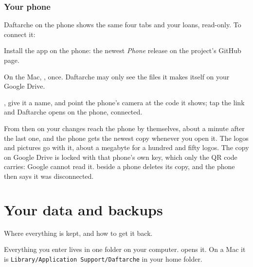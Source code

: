 \documentclass[11pt]{article}
\begin{document}
\subsection{Your phone}
Daftarche on the phone shows the same four tabs and your loans, read-only. To connect it:
\begin{steps}
  \item Install the app on the phone: the newest \emph{Phone} release on the project's GitHub page.
  \item On the Mac, , once. Daftarche may only
        see the files it makes itself on your Google Drive.
  \item {}, give it a name, and point the phone's camera at the code it shows;
        tap the link and Daftarche opens on the phone, connected.
\end{steps}
From then on your changes reach the phone by themselves, about a minute after the last one, and the
phone gets the newest copy whenever you open it. The logos and pictures go with it, about a
megabyte for a hundred and fifty logos. The copy on Google Drive is locked with that phone's
own key, which only the QR code carries: Google cannot read it.  beside a phone
deletes its copy, and the phone then says it was disconnected.

\chapter{Your data and backups}{Where everything is kept, and how to get it back.}\label{ch:9}

Everything you enter lives in one folder on your computer.  opens it.
On a Mac it is \texttt{\small Library/Application Support/Daftarche} in your home folder.
\end{document}
